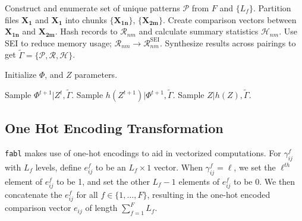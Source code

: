 \documentclass[ba]{imsart}
\begin{document}
	\begin{algorithm}[h!]
		\begin{algorithmic}[1]
			
			\State Construct and enumerate set of unique patterns $\mathcal{P}$ from $F$ and $\{L_f\}$.
			\State Partition files $\bm{X_1}$ and $\bm{X_1}$ into chunks $\{\bm{X_{1n}}\}$, $\{\bm{X_{2m}}\}$.
			\State Create comparison vectors between $\bm{X_{1n}}$ and $\bm{X_{2m}}$.
			\State Hash records to $\mathcal{R}_{nm}$ and calculate summary statistics $\mathcal{H}_{nm}$.
			\State Use SEI to reduce memory usage; $\mathcal{R}_{nm} \to \mathcal{R}_{nm}^{\text{SEI}}$.
			\EndFor
			\State Synthesize results across pairings to get $\tilde{\Gamma} = \{\mathcal{P}, \mathcal{R}, \mathcal{H} \}$.
			\EndProcedure
			
			\State Initialize $\Phi$, and $Z$ parameters.
			
			\State Sample $\Phi^{t+1}|Z^{t}, \tilde{\Gamma}$.
			\State Sample $h\left(Z^{t+1}\right)|\Phi^{t+1}, \tilde{\Gamma}$.  
			\EndFor
			\State Sample $Z | h(Z), \tilde{\Gamma}$. 
			
			\EndProcedure
			
		\end{algorithmic}
	\end{algorithm}
	\clearpage
	
	\hypertarget{app:ohe}{%
		\subsection{One Hot Encoding Transformation}\label{app:ohe}}
	
	\texttt{fabl} makes use of one-hot encodings to aid in vectorized computations. For $\gamma_{ij}^f$ with $L_f$ levels, define $e_{ij}^f$ to be an $L_f \times 1$ vector.  When $\gamma_{ij}^f = \ell$, we set the $\ell^{th}$ element of $e_{ij}^f$ to be 1, and set the other $L_f - 1$ elements of $e_{ij}^f$ to be 0. We then concatenate the $e_{ij}^f$ for all $f \in \{1, \ldots, F\}$, resulting in the one-hot encoded comparison vector $e_{ij}$ of length $\sum_{f=1}^F L_f$.
	
\end{document}
